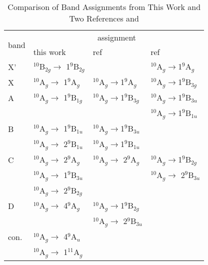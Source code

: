 \begin{refsection}
\begin{table}[htbp!]
	\centering
	\begin{threeparttable}
	\caption{Comparison of Band Assignments from This Work and Two References   and }
	\label{table:DBA}
	\begin{tabular}{@{}llll@{}}
		\toprule
		\multirow{2}{*}{band} & \multicolumn{3}{c}{assignment}                \\ \cmidrule(l){2-4}
	 & this work     		  & ref  \citenum{Zhai06}     & ref \citenum{Tono2003B}   \\ \midrule
 X'  & $^{10}$B$_{2g} \longrightarrow$ 1$^9$B$_{2g}$ &               				             & $^{10}$A$_g \longrightarrow 		$1$^9$A$_g$    \\
 X   & $^{10}$A$_g \longrightarrow$ 1$^9$A$_g$       & $^{10}$A$_g \longrightarrow $1$^9$A$_g$   & $^{10}$A$_g \longrightarrow $1$^9$B$_{3g}$ \\
 A   & $^{10}$A$_g \longrightarrow$ 1$^9$B$_{1g}$    & $^{10}$A$_g \longrightarrow $1$^9$B$_{3g}$& $^{10}$A$_g \longrightarrow $1$^9$B$_{3u}$ \\
	 &               						  		 &               				             & $^{10}$A$_g \longrightarrow $1$^9$B$_{1u}$ \\
 B   & $^{10}$A$_g \longrightarrow$ 1$^9$B$_{1u}$    & $^{10}$A$_g \longrightarrow $1$^9$B$_{3u}$&               \\
	 & $^{10}$A$_g \longrightarrow$ 2$^9$B$_{1u}$    & $^{10}$A$_g \longrightarrow $1$^9$B$_{1u}$&               \\
 C   & $^{10}$A$_g \longrightarrow$ 2$^9$A$_g$       & $^{10}$A$_g \longrightarrow$ 2$^9$A$_g$   & $^{10}$A$_g \longrightarrow $1$^9$B$_{2g}$ \\
	 & $^{10}$A$_g \longrightarrow$ 1$^9$B$_{3u}$    &               				             & $^{10}$A$_g \longrightarrow$ 2$^9$B$_{3u}$ \\
	 & $^{10}$A$_g \longrightarrow$ 2$^9$B$_{2g}$    &               				             &               \\
 D   & $^{10}$A$_g \longrightarrow$ 4$^9$A$_g$       & $^{10}$A$_g \longrightarrow $1$^9$B$_{2g}$&               \\
	 &               					             & $^{10}$A$_g \longrightarrow$ 2$^9$B$_{3u}$&               \\
 con.& $^{10}$A$_g \longrightarrow$ 4$^9$A$_u$       &               		        		     &               \\
	 & $^{10}$A$_g \longrightarrow$ 1$^{11}$A$_g$    &               				             &               \\

\end{tabular}
\end{threeparttable}
\end{table}
\end{refsection}
